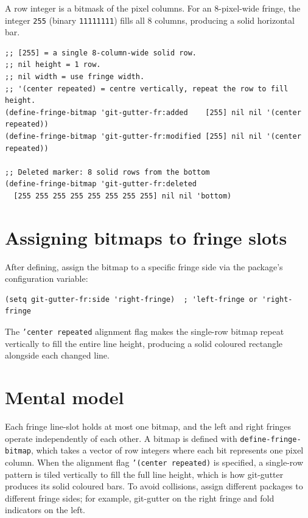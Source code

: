 A row integer is a bitmask of the pixel columns. For an 8-pixel-wide fringe, the integer \texttt{255} (binary \texttt{11111111}) fills all 8 columns, producing a solid horizontal bar.

\begin{verbatim}
;; [255] = a single 8-column-wide solid row.
;; nil height = 1 row.
;; nil width = use fringe width.
;; '(center repeated) = centre vertically, repeat the row to fill height.
(define-fringe-bitmap 'git-gutter-fr:added    [255] nil nil '(center repeated))
(define-fringe-bitmap 'git-gutter-fr:modified [255] nil nil '(center repeated))

;; Deleted marker: 8 solid rows from the bottom
(define-fringe-bitmap 'git-gutter-fr:deleted
  [255 255 255 255 255 255 255 255] nil nil 'bottom)
\end{verbatim}

\section{Assigning bitmaps to fringe slots}\label{assigning-bitmaps-to-fringe-slots}

After defining, assign the bitmap to a specific fringe side via the package's configuration variable:

\begin{verbatim}
(setq git-gutter-fr:side 'right-fringe)  ; 'left-fringe or 'right-fringe
\end{verbatim}

The \texttt{'center repeated} alignment flag makes the single-row bitmap repeat vertically to fill the entire line height, producing a solid coloured rectangle alongside each changed line.

\section{Mental model}
Each fringe line-slot holds at most one bitmap, and the left and right
fringes operate independently of each other.  A bitmap is defined with
\texttt{define-fringe-bitmap}, which takes a vector of row integers where each
bit represents one pixel column.  When the alignment flag
\texttt{'(center repeated)} is specified, a single-row pattern is tiled
vertically to fill the full line height, which is how git-gutter produces its
solid coloured bars.  To avoid collisions, assign different packages to
different fringe sides; for example, git-gutter on the right fringe and fold
indicators on the left.
